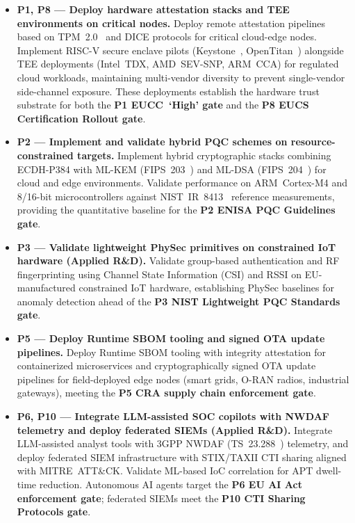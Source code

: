 \begin{itemize}

    \item \textbf{P1, P8 --- Deploy hardware attestation stacks and
    TEE environments on critical nodes.}
    Deploy remote attestation pipelines based on TPM~2.0~\cite{tpm20}
    and DICE protocols for critical cloud-edge nodes. Implement
    RISC-V secure enclave pilots (Keystone~\cite{keystone},
    OpenTitan~\cite{opentitan}) alongside TEE deployments (Intel~TDX,
    AMD~SEV-SNP, ARM~CCA) for regulated cloud workloads, maintaining
    multi-vendor diversity to prevent single-vendor side-channel
    exposure. These deployments establish the hardware trust substrate
    for both the \textbf{P1 EUCC~`High' gate} and the
    \textbf{P8 EUCS Certification Rollout gate}.

    \item \textbf{P2 --- Implement and validate hybrid PQC schemes on
    resource-constrained targets.}
    Implement hybrid cryptographic stacks combining ECDH-P384 with
    ML-KEM (FIPS~203~\cite{fips203}) and ML-DSA
    (FIPS~204~\cite{fips204}) for cloud and edge environments.
    Validate performance on ARM~Cortex-M4 and 8/16-bit microcontrollers
    against NIST~IR~8413~\cite{nistir8413} reference measurements,
    providing the quantitative baseline for the
    \textbf{P2 ENISA PQC Guidelines gate}.

    \item \textbf{P3 --- Validate lightweight PhySec primitives on
    constrained IoT hardware (Applied R\&D).}
    Validate group-based authentication and RF fingerprinting using
    Channel State Information (CSI) and RSSI on EU-manufactured
    constrained IoT hardware, establishing PhySec baselines for
    anomaly detection ahead of the
    \textbf{P3 NIST Lightweight PQC Standards gate}.

    \item \textbf{P5 --- Deploy Runtime SBOM tooling and signed OTA
    update pipelines.}
    Deploy Runtime SBOM tooling with integrity attestation for
    containerized microservices and cryptographically signed OTA update
    pipelines for field-deployed edge nodes (smart grids, O-RAN radios,
    industrial gateways), meeting the
    \textbf{P5 CRA supply chain enforcement gate}.

    \item \textbf{P6, P10 --- Integrate LLM-assisted SOC copilots with
    NWDAF telemetry and deploy federated SIEMs (Applied R\&D).}
    Integrate LLM-assisted analyst tools with 3GPP NWDAF
    (TS~23.288~\cite{3gpp23288}) telemetry, and deploy federated SIEM
    infrastructure with STIX/TAXII CTI sharing aligned with
    MITRE~ATT\&CK. Validate ML-based IoC correlation for APT
    dwell-time reduction. Autonomous AI agents target the
    \textbf{P6 EU AI Act enforcement gate}; federated SIEMs meet the
    \textbf{P10 CTI Sharing Protocols gate}.


\end{itemize}
